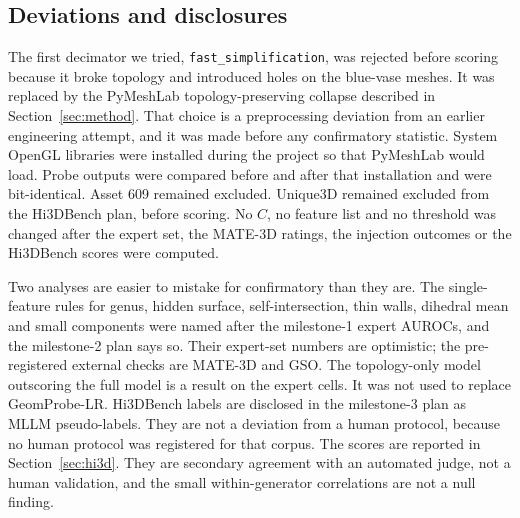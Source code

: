 \subsection{Deviations and disclosures}
The first decimator we tried, \texttt{fast\_simplification}, was rejected before scoring because it broke topology and introduced holes on the blue-vase meshes.
It was replaced by the PyMeshLab topology-preserving collapse described in Section~\ref{sec:method}.
That choice is a preprocessing deviation from an earlier engineering attempt, and it was made before any confirmatory statistic.
System OpenGL libraries were installed during the project so that PyMeshLab would load.
Probe outputs were compared before and after that installation and were bit-identical.
Asset 609 remained excluded.
Unique3D remained excluded from the Hi3DBench plan, before scoring.
No \(C\), no feature list and no threshold was changed after the expert set, the MATE-3D ratings, the injection outcomes or the Hi3DBench scores were computed.

Two analyses are easier to mistake for confirmatory than they are.
The single-feature rules for genus, hidden surface, self-intersection, thin walls, dihedral mean and small components were named after the milestone-1 expert AUROCs, and the milestone-2 plan says so.
Their expert-set numbers are optimistic; the pre-registered external checks are MATE-3D and GSO.
The topology-only model outscoring the full model is a result on the expert cells.
It was not used to replace GeomProbe-LR.
Hi3DBench labels are disclosed in the milestone-3 plan as MLLM pseudo-labels.
They are not a deviation from a human protocol, because no human protocol was registered for that corpus.
The scores are reported in Section~\ref{sec:hi3d}.
They are secondary agreement with an automated judge, not a human validation, and the small within-generator correlations are not a null finding.
